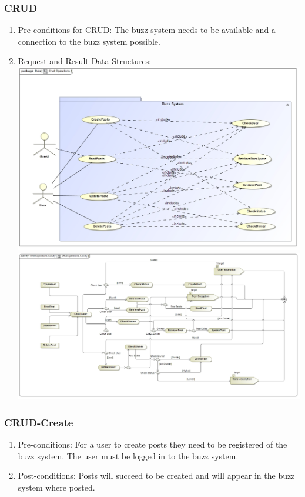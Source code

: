 \documentclass[12pt, oneside]{article}
\begin{document}
\subsubsection{CRUD}
\begin{enumerate}
 \item Pre-conditions for CRUD: The buzz system needs to be available and a connection to the buzz system possible.
 
  \item Request and Result Data Structures: \\
 \includegraphics[scale=0.3]{CRUDOperations}\\
 \includegraphics[scale=0.3]{CRUDOperationsActivity} 
\end{enumerate}
\subsubsection{CRUD-Create}
\begin{enumerate}
 \item Pre-conditions: For a user to create posts they need to be registered of the buzz system. The user must be logged in to the buzz system.
 \\
 \item Post-conditions: Posts will succeed to be created and will appear in the buzz system where posted.
  \\
 
\end{enumerate}
\end{document}
